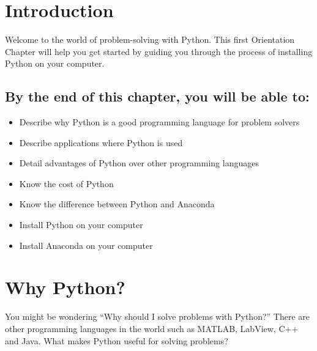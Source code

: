 \documentclass{book}
\providecommand{\tightlist}{%
      \setlength{\itemsep}{0pt}\setlength{\parskip}{0pt}}
\begin{document}
    
        \section{Introduction}\label{introduction}
    




    
        Welcome to the world of problem-solving with Python. This first
Orientation Chapter will help you get started by guiding you through the
process of installing Python on your computer.
    




    
        \subsection{By the end of this chapter, you will be able
to:}\label{by-the-end-of-this-chapter-you-will-be-able-to}

\begin{itemize}
\tightlist
\item
  Describe why Python is a good programming language for problem solvers
\item
  Describe applications where Python is used
\item
  Detail advantages of Python over other programming languages
\item
  Know the cost of Python
\item
  Know the difference between Python and Anaconda
\item
  Install Python on your computer
\item
  Install Anaconda on your computer
\end{itemize}
        \newpage



    




    
        \section{Why Python?}\label{why-python}
    




    
        You might be wondering ``Why should I solve problems with Python?''
There are other programming languages in the world such as MATLAB,
LabView, C++ and Java. What makes Python useful for solving problems?
    
\end{document}
